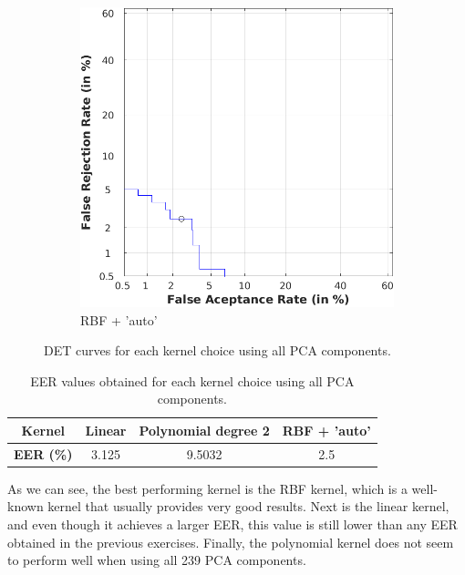 \documentclass[11pt]{article}
\begin{document}
\begin{figure}[h!]
     ~\vspace{1.5em}

     \begin{subfigure}[t]{0.4\textwidth}
         \centering
         \includegraphics[scale=0.45]{img/3a_rbf_det}
         \caption{RBF + 'auto'}
     \end{subfigure}
    \caption{DET curves for each kernel choice using all PCA components.}
    \label{fig:ex3a}
\end{figure}

\begin{table}[h!]
  \centering
  \begin{tabular}{c|ccc}
    \textbf{Kernel} & Linear & Polynomial degree 2 & RBF + 'auto'\\
    \hline
    \textbf{EER (\%)} & 3.125 & 9.5032 & {\color{red}2.5}\\
  \end{tabular}
  \caption{EER values obtained for each kernel choice using all PCA components.}
  \label{tab:ex3a}
\end{table}

As we can see, the best performing kernel is the RBF kernel, which is a well-known kernel that usually provides very good results. Next is the linear kernel, and even though it achieves a larger EER, this value is still lower than any EER obtained in the previous exercises. Finally, the polynomial kernel does not seem to perform well when using all 239 PCA components.
\end{document}
